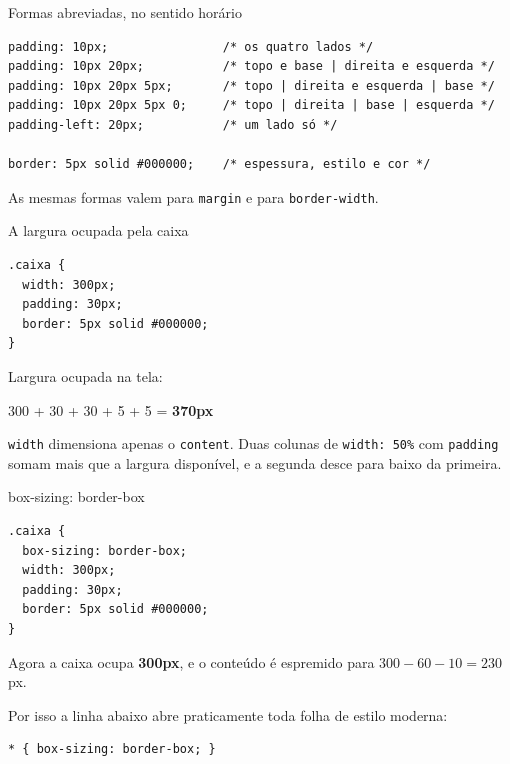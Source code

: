 \documentclass{beamer}
\begin{document}
\begin{frame}[fragile]{Formas abreviadas, no sentido horário}
	\begin{verbatim}
padding: 10px;                /* os quatro lados */
padding: 10px 20px;           /* topo e base | direita e esquerda */
padding: 10px 20px 5px;       /* topo | direita e esquerda | base */
padding: 10px 20px 5px 0;     /* topo | direita | base | esquerda */
padding-left: 20px;           /* um lado só */

border: 5px solid #000000;    /* espessura, estilo e cor */
  \end{verbatim}

	\vspace{0.2cm}
	As mesmas formas valem para \texttt{margin} e para \texttt{border-width}.
\end{frame}

\begin{frame}[fragile]{A largura ocupada pela caixa}
	\begin{verbatim}
.caixa {
  width: 300px;
  padding: 30px;
  border: 5px solid #000000;
}
  \end{verbatim}

	\vspace{0.3cm}
	Largura ocupada na tela:

	\begin{center}
		\large 300 + 30 + 30 + 5 + 5 = \textbf{370px}
	\end{center}

	\vspace{0.3cm}
	\texttt{width} dimensiona apenas o \texttt{content}. Duas colunas de
	\texttt{width: 50\%} com \texttt{padding} somam mais que a largura disponível,
	e a segunda desce para baixo da primeira.
\end{frame}

\begin{frame}[fragile]{box-sizing: border-box}
	\begin{verbatim}
.caixa {
  box-sizing: border-box;
  width: 300px;
  padding: 30px;
  border: 5px solid #000000;
}
  \end{verbatim}

	\vspace{0.3cm}
	Agora a caixa ocupa \textbf{300px}, e o conteúdo é espremido para
	$300 - 60 - 10 = 230$px.

	\vspace{0.3cm}
	Por isso a linha abaixo abre praticamente toda folha de estilo moderna:

	\begin{verbatim}
* { box-sizing: border-box; }
  \end{verbatim}
\end{frame}
\end{document}
